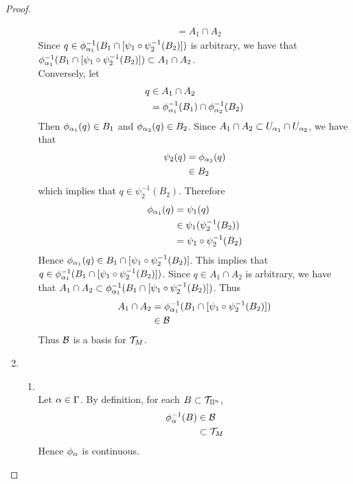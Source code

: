 \documentclass{book}
\begin{document}
\begin{proof}
\begin{enumerate}
\begin{itemize}
\begin{align*}
					& = A_1 \cap A_2
				\end{align*}
				Since $q \in \phi_{\alpha_1}^{-1}(B_1 \cap [\psi_1 \circ \psi_2^{-1}(B_2)])$ is arbitrary, we have that $\phi_{\alpha_1}^{-1}(B_1 \cap [\psi_1 \circ \psi_2^{-1}(B_2)]) \subset A_1 \cap A_2$. \\
				Conversely, let  
				\begin{align*}
					q 
					& \in A_1 \cap A_2 \\ 
					& = \phi_{\alpha_1}^{-1}(B_1) \cap \phi_{\alpha_2}^{-1}(B_2)
				\end{align*}
				Then $\phi_{\alpha_1}(q) \in B_1$ and $\phi_{\alpha_2}(q) \in B_2$. Since $A_1 \cap A_2 \subset U_{\alpha_1} \cap U_{\alpha_2}$, we have that 
				\begin{align*}
					\psi_2(q)
					& = \phi_{\alpha_2}(q) \\
					& \in B_2
				\end{align*}
				which implies that $q \in \psi_2^{-1}(B_2)$. Therefore 
				\begin{align*}
					\phi_{\alpha_1}(q)
					& = \psi_1(q) \\
					& \in \psi_1 ( \psi_2^{-1}(B_2)) \\
					& =  \psi_1 \circ \psi_2^{-1}(B_2) 
				\end{align*}
				Hence $\phi_{\alpha_1}(q) \in B_1 \cap [\psi_1 \circ \psi_2^{-1}(B_2)]$. This implies that $q \in \phi_{\alpha_1}^{-1}( B_1 \cap [\psi_1 \circ \psi_2^{-1}(B_2)])$. Since $q \in A_1 \cap A_2$ is arbitrary, we have that $A_1 \cap A_2 \subset \phi_{\alpha_1}^{-1}( B_1 \cap [\psi_1 \circ \psi_2^{-1}(B_2)])$. Thus 
				\begin{align*}
					A_1 \cap A_2 
					& = \phi_{\alpha_1}^{-1}( B_1 \cap [\psi_1 \circ \psi_2^{-1}(B_2)]) \\
					& \in \mathcal{B}
				\end{align*}
				Thus $\mathcal{B}$ is a basis for $\mathcal{T}_M$.
			\end{itemize}
			\item 
			\begin{enumerate}
				\item {}\\
				Let $\alpha \in \Gamma$. By definition, for each $B \subset \mathcal{T}_{\mathbb{H}^n}$, 
				\begin{align*}
					\phi_{\alpha}^{-1}(B) 
					& \in \mathcal{B} \\
					& \subset \mathcal{T}_M
				\end{align*}
				Hence $\phi_{\alpha}$ is continuous. \\

\end{enumerate}
\end{enumerate}
\end{proof}
\end{document}
